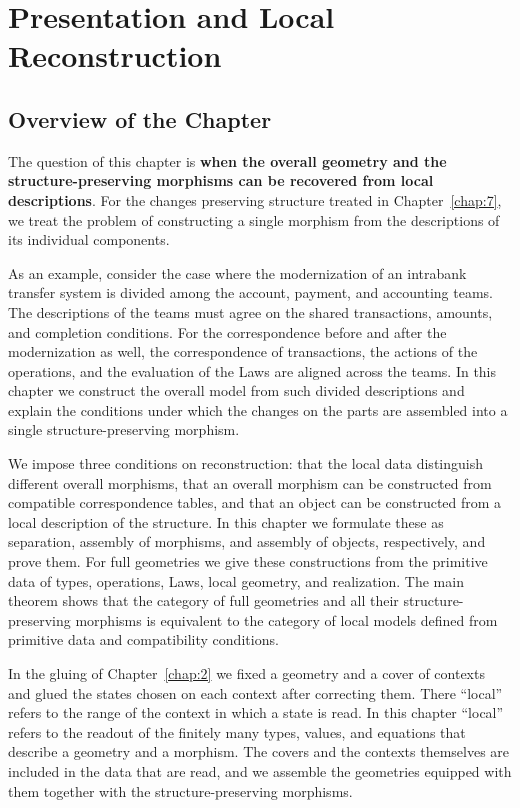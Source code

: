 \chapter{Presentation and Local Reconstruction}\label{chap:8}

\section*{Overview of the Chapter}

The question of this chapter is \textbf{when the overall geometry and the
structure-preserving morphisms can be recovered from local descriptions}.
For the changes preserving structure treated in Chapter~\ref{chap:7}, we treat the problem of
constructing a single morphism from the descriptions of its individual components.

As an example, consider the case where the modernization of an intrabank transfer system is
divided among the account, payment, and accounting teams.
The descriptions of the teams must agree on the shared transactions, amounts, and
completion conditions.
For the correspondence before and after the modernization as well, the correspondence
of transactions, the actions of the operations, and the evaluation of the Laws are
aligned across the teams.
In this chapter we construct the overall model from such divided descriptions and explain the
conditions under which the changes on the parts are assembled into a single
structure-preserving morphism.

We impose three conditions on reconstruction:
that the local data distinguish different overall morphisms,
that an overall morphism can be constructed from compatible correspondence tables,
and that an object can be constructed from a local description of the structure.
In this chapter we formulate these as separation, assembly of morphisms, and assembly of
objects, respectively, and prove them.
For full geometries we give these constructions from the primitive data of types, operations,
Laws, local geometry, and realization.
The main theorem shows that the category of full geometries and all their
structure-preserving morphisms is equivalent to the category of local models defined from
primitive data and compatibility conditions.

In the gluing of Chapter~\ref{chap:2} we fixed a geometry and a cover of contexts and glued
the states chosen on each context after correcting them.
There ``local'' refers to the range of the context in which a state is read.
In this chapter ``local'' refers to the readout of the finitely many types, values, and
equations that describe a geometry and a morphism.
The covers and the contexts themselves are included in the data that are read, and we assemble
the geometries equipped with them together with the structure-preserving morphisms.

